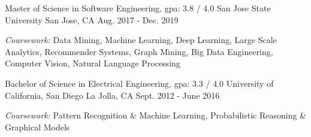 

\begin{cventries}

  \cventry
    {Master of Science in Software Engineering, gpa: 3.8 / 4.0 } %
    {San Jose State University} %
    {San Jose, CA} %
    {Aug. 2017 - Dec. 2019} %
    {
      \begin{cvitems} %
        \item {\textit{Coursework:} Data Mining, Machine Learning, Deep Learning, Large Scale Analytics, Recommender Systems, Graph Mining, Big Data Engineering, Computer Vision, Natural Language Processing}
      \end{cvitems}
    }
   
  \cventry
    {Bachelor of Science in Electrical Engineering, gpa: 3.3 / 4.0} %
    {University of California, San Diego} %
    {La Jolla, CA} %
    {Sept. 2012 - June 2016} %
    {
      \begin{cvitems} %
        \item {\textit{Coursework:} Pattern Recognition \& Machine Learning, Probabilistic Reasoning \& Graphical Models}
      \end{cvitems}
    }

\end{cventries}

